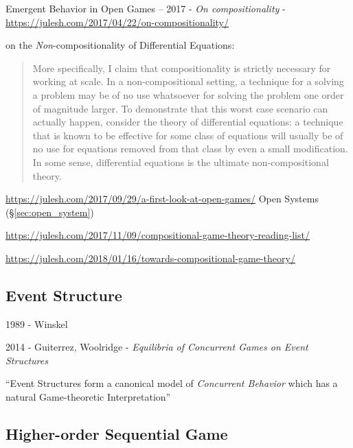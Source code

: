 \begin{itemize}
Emergent Behavior in Open Games --
2017 - \emph{On compositionality} -
\url{https://julesh.com/2017/04/22/on-compositionality/}

on the \emph{Non}-compositionality of Differential Equations:
\begin{quote}
  More specifically, I claim that compositionality is strictly necessary
  for working at scale. In a non-compositional setting, a technique for a
  solving a problem may be of no use whatsoever for solving the problem one
  order of magnitude larger. To demonstrate that this worst case scenario can
  actually happen, consider the theory of differential equations: a technique
  that is known to be effective for some class of equations will usually be of
  no use for equations removed from that class by even a small modification. In
  some sense, differential equations is the ultimate non-compositional theory.
\end{quote}

\url{https://julesh.com/2017/09/29/a-first-look-at-open-games/} \fist Open
Systems (\S\ref{sec:open_system})

\url{https://julesh.com/2017/11/09/compositional-game-theory-reading-list/}


\url{https://julesh.com/2018/01/16/towards-compositional-game-theory/}



\subsection{Event Structure}\label{sec:event_structure}

1989 - Winskel

2014 - Guiterrez, Woolridge - \emph{Equilibria of Concurrent Games on Event
  Structures}

``Event Structures form a canonical model of \emph{Concurrent Behavior} which
has a natural Game-theoretic Interpretation''



\subsection{Higher-order Sequential Game}\label{sec:higherorder_sequential_game}


\end{itemize}
